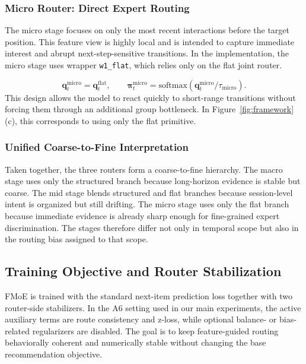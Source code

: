 \documentclass[sigconf,authordraft]{acmart}
\begin{document}
\subsubsection{Micro Router: Direct Expert Routing}

The micro stage focuses on only the most recent interactions before the target position. This feature view is highly local and is intended to capture immediate interest and abrupt next-step-sensitive transitions. In the implementation, the micro stage uses wrapper \texttt{w1\_flat}, which relies only on the flat joint router.

\[
\mathbf{q}^{\mathrm{micro}}_t
=
\mathbf{q}^{\mathrm{flat}}_t,
\qquad
\boldsymbol{\pi}^{\mathrm{micro}}_t
=
\mathrm{softmax}\!\left(\mathbf{q}^{\mathrm{micro}}_t / \tau_{\mathrm{micro}}\right).
\]
This design allows the model to react quickly to short-range transitions without forcing them through an additional group bottleneck. In Figure~\ref{fig:framework}(c), this corresponds to using only the flat primitive.

\subsubsection{Unified Coarse-to-Fine Interpretation}

Taken together, the three routers form a coarse-to-fine hierarchy. The macro stage uses only the structured branch because long-horizon evidence is stable but coarse. The mid stage blends structured and flat branches because session-level intent is organized but still drifting. The micro stage uses only the flat branch because immediate evidence is already sharp enough for fine-grained expert discrimination. The stages therefore differ not only in temporal scope but also in the routing bias assigned to that scope.

\subsection{Training Objective and Router Stabilization}

FMoE is trained with the standard next-item prediction loss together with two router-side stabilizers. In the A6 setting used in our main experiments, the active auxiliary terms are route consistency and z-loss, while optional balance- or bias-related regularizers are disabled. The goal is to keep feature-guided routing behaviorally coherent and numerically stable without changing the base recommendation objective.
\end{document}
